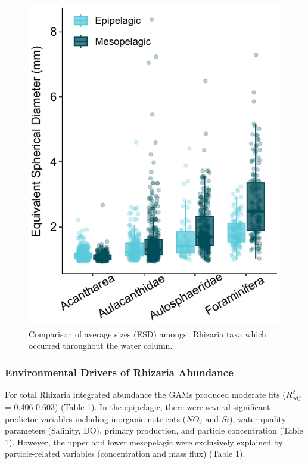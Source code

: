 \documentclass[
]{article}
\begin{document}
\begin{figure}

{\centering \includegraphics{images/09_size-comp.pdf}

}

\caption{Comparison of average sizes (ESD) amongst Rhizaria taxa which
occurred throughout the water column.}

\end{figure}

\hypertarget{environmental-drivers-of-rhizaria-abundance}{%
\subsubsection{Environmental Drivers of Rhizaria
Abundance}\label{environmental-drivers-of-rhizaria-abundance}}

For total Rhizaria integrated abundance the GAMs produced moderate fits
(\(R^2_{adj}\) = 0.406-0.603) (Table 1). In the epipelagic, there were
several significant predictor variables including inorganic nutrients
(\(NO_3\) and \(Si\)), water quality parameters (Salinity, DO), primary
production, and particle concentration (Table 1). However, the upper and
lower mesopelagic were exclusively explained by particle-related
variables (concentration and mass flux) (Table 1).
\end{document}
